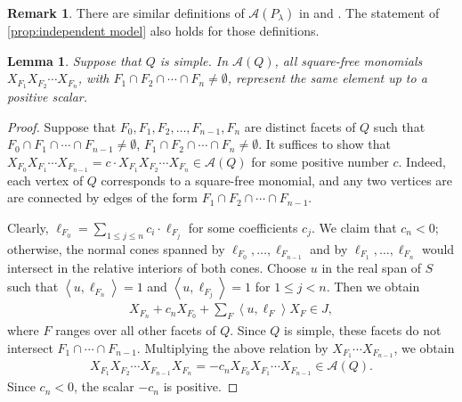 \documentclass{amsart}
\theoremstyle{plain} \numberwithin{equation}{section}
\newtheorem{lemma}[theorem]{Lemma}
\theoremstyle{definition}
\newtheorem{remark}[theorem]{Remark}
\newcommand{\ip}[1]{\left\langle #1 \right\rangle}
\begin{document}
\begin{remark}
 There are similar definitions of $\mathcal{A}(P_{\lambda})$ in  \cite[(1.2)]{stembridgePermutationRepresentationsWeyl1994} and \cite[\S4]{guiWeylGroupSymmetries2025}. The statement of \cref{prop:independent model} also holds for those definitions.
\end{remark}



\begin{lemma}\label{lem:vertex generate same}
  Suppose that $Q$ is simple.
  In $\mathcal{A}(Q)$, all square-free monomials $X_{F_{1}}{X_{F_{2}}}\cdots{X_{F_{n}}}$,  with $F_{1}\cap F_{2}\cap\cdots\cap F_{n}\ne\emptyset$, represent the same element up to a positive scalar.
\end{lemma}
\begin{proof}
  Suppose that $F_{0},F_{1},F_{2},\ldots,F_{{n-1}},F_{n}$ are distinct facets of $Q$ such that $F_{0}\cap F_{1}\cap\cdots\cap F_{{n-1}}\ne\emptyset$,  $F_{1}\cap F_{2}\cap\cdots\cap F_{{n}}\ne\emptyset$. 
  It suffices to show that $X_{F_{0}}X_{F_{1}}\cdots X_{F_{{n-1}}}= c\cdot X_{F_{1}}X_{F_{2}}\cdots X_{F_{{n}}}\in \mathcal{A}(Q)$ for some positive number $c$. Indeed, each vertex of $Q$ corresponds to a square-free monomial, and any two vertices are  are connected by edges of the form $F_{1}\cap F_{2}\cap\cdots\cap F_{n-1}$.

  Clearly, $\ell_{F_{0}}=\sum_{1\leq j\leq n}c_i\cdot\ell_{F_{j}}$ for some coefficients $c_j$. 
  We claim that \(c_n<0\); otherwise, the normal cones spanned by
$\ell_{F_{0}},\ldots,\ell_{F_{n-1}}$ and by
$\ell_{F_{1}},\ldots,\ell_{F_{n}}$
would intersect in the relative interiors of both cones.
 Choose $u$ in the real span of $S$ such that $\ip{u,\ell_{F_{n}}}=1$ and $\ip{u,\ell_{F_{j}}}=1$ for $1\leq j< n$. Then we obtain
 \begin{align*}
   {X_{F_{n}}}+c_nX_{F_{0}}+ \sum_{F}\ip{u,\ell_F}X_F\in J,
 \end{align*}
 where $F$ ranges over all other facets of $Q$.
 Since $Q$ is simple, these facets do not intersect
$F_{1}\cap\cdots\cap F_{n-1}$.
  Multiplying the above relation by
$X_{F_{1}}\cdots X_{F_{n-1}}$, we obtain
 \begin{align*}
  X_{F_{1}}{X_{F_{2}}}\cdots X_{F_{{n-1}}}{X_{F_{n}}}=-c_nX_{F_{0}}X_{F_{1}}\cdots X_{F_{{n-1}}}\in \mathcal{A}(Q).
 \end{align*}
 Since $c_n<0$, the scalar $-c_n$ is positive.
 \qedhere
\end{proof}
\end{document}
